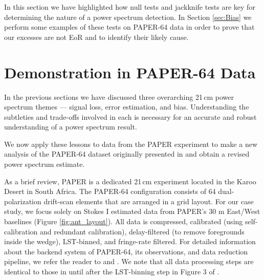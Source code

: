 \documentclass[preprint2,numberedappendix,tighten]{aastex6}
\begin{document}
In this section we have highlighted how null tests and jackknife tests are key for determining the nature of a power spectrum 
detection. In Section \ref{sec:Bias} we perform some examples of these tests on PAPER-64 data in order to prove that our 
excesses are not EoR and to identify their likely cause. 


\section{Demonstration in PAPER-64 Data}
\label{sec:CaseStudy}

In the previous sections we have discussed three overarching 21\,cm power spectrum themes --- signal loss, error estimation, 
and bias. Understanding the subtleties and trade-offs involved in each is necessary for an accurate and robust understanding of 
a power spectrum result. 

We now apply these lessons to data from the PAPER experiment to make a new analysis of the PAPER-64 dataset originally presented in 
 and obtain a revised power spectrum estimate.

As a brief review, PAPER is a dedicated 21\,cm experiment located in the Karoo Desert in South Africa. The PAPER-64 
configuration consists of 64 dual-polarization drift-scan elements that are arranged in a grid layout. For our case study, we 
focus solely on Stokes I estimated data \citep{moore_et_al2013} from PAPER's $30$ m East/West baselines (Figure 
\ref{fig:ant_layout}). All data is compressed, calibrated (using self-calibration and redundant calibration), delay-filtered (to remove foregrounds inside the wedge), LST-binned, and fringe-rate filtered. For detailed information about the backend system of PAPER-64, its observations, and data reduction pipeline, we 
refer the reader to \citet{parsons_et_al2010} and . We note that all data processing steps are identical to those in  until after the LST-binning step in Figure 3 of .
\end{document}
